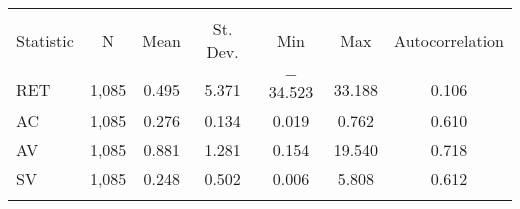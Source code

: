
  \begin{tabular}{@{\extracolsep{5pt}}lcccccc} 
\hline \hline\\[-1.8ex] 
Statistic & \multicolumn{1}{c}{N} & \multicolumn{1}{c}{Mean} & \multicolumn{1}{c}{St. Dev.} & \multicolumn{1}{c}{Min} & \multicolumn{1}{c}{Max} & \multicolumn{1}{c}{Autocorrelation}\\ 
\hline \\[-1.8ex] 
RET & 1,085 & 0.495 & 5.371 & $-$34.523 & 33.188 & 0.106\\ 
AC & 1,085 & 0.276 & 0.134 & 0.019 & 0.762 & 0.610\\ 
AV & 1,085 & 0.881 & 1.281 & 0.154 & 19.540 & 0.718\\ 
SV & 1,085 & 0.248 & 0.502 & 0.006 & 5.808 & 0.612\\ 
\hline \\[-1.8ex] 
\end{tabular}